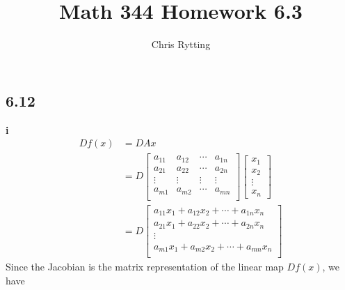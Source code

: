 \documentclass[letterpaper,12pt]{article}
\theoremstyle{definition}
\begin{document}
\title{Math 344 Homework 6.3}
\author{Chris Rytting}
\maketitle

\subsection*{6.12}
\textbf{i}
\begin{align*}
    Df(x) &= DAx \\
    &=
    D\begin{bmatrix}
        a_{11} & a_{12} & \cdots & a_{1n} \\
        a_{21} & a_{22} & \cdots & a_{2n} \\
        \vdots & \vdots & \vdots & \vdots \\
        a_{m1} & a_{m2} & \cdots & a_{mn} \\
    \end{bmatrix}
    \begin{bmatrix}
        x_1 \\x_2 \\ \vdots \\ x_n 
    \end{bmatrix}\\
    &=
    D\begin{bmatrix}
        a_{11}x_1 +  a_{12}x_2 +  \cdots + a_{1n}x_n \\
        a_{21}x_1 + a_{22}x_2 + \cdots + a_{2n}x_n \\
        \vdots \\
        a_{m1}x_1 + a_{m2}x_2 + \cdots + a_{mn}x_n \\
    \end{bmatrix}
\end{align*}
Since the Jacobian is the matrix representation of the linear map $Df(x)$, we have
   
\end{document}
